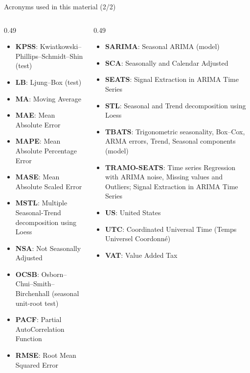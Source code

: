 \begin{frame}{Acronyms used in this material (2/2)}
\begin{columns}[T]
\begin{column}{0.49\textwidth}
\begin{itemize}\setlength{\itemsep}{0pt}
    \item \textbf{KPSS}: Kwiatkowski–Phillips–Schmidt–Shin (test)
    \item \textbf{LB}: Ljung–Box (test)
    \item \textbf{MA}: Moving Average
    \item \textbf{MAE}: Mean Absolute Error
    \item \textbf{MAPE}: Mean Absolute Percentage Error
    \item \textbf{MASE}: Mean Absolute Scaled Error
    \item \textbf{MSTL}: Multiple Seasonal-Trend decomposition using Loess
    \item \textbf{NSA}: Not Seasonally Adjusted
    \item \textbf{OCSB}: Osborn–Chui–Smith–Birchenhall (seasonal unit-root test)
    \item \textbf{PACF}: Partial AutoCorrelation Function
    \item \textbf{RMSE}: Root Mean Squared Error
\end{itemize}
\end{column}
\begin{column}{0.49\textwidth}
\begin{itemize}\setlength{\itemsep}{0pt}
    \item \textbf{SARIMA}: Seasonal ARIMA (model)
    \item \textbf{SCA}: Seasonally and Calendar Adjusted
    \item \textbf{SEATS}: Signal Extraction in ARIMA Time Series
    \item \textbf{STL}: Seasonal and Trend decomposition using Loess
    \item \textbf{TBATS}: Trigonometric seasonality, Box–Cox, ARMA errors, Trend, Seasonal components (model)
    \item \textbf{TRAMO-SEATS}: Time series Regression with ARIMA noise, Missing values and Outliers; Signal Extraction in ARIMA Time Series
    \item \textbf{US}: United States
    \item \textbf{UTC}: Coordinated Universal Time (Temps Universel Coordonné)
    \item \textbf{VAT}: Value Added Tax
\end{itemize}
\end{column}
\end{columns}
\end{frame}


